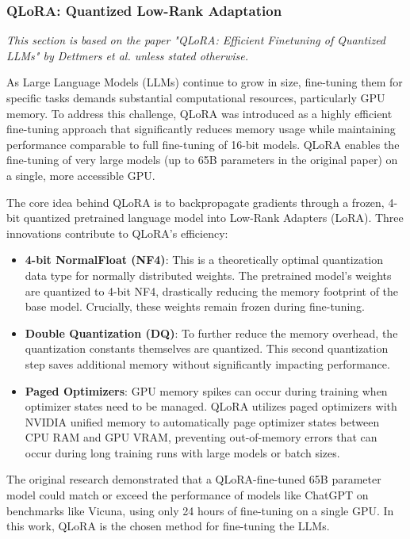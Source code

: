 \subsubsection{QLoRA: Quantized Low-Rank Adaptation}
\textit{This section is based on the paper "QLoRA: Efficient Finetuning of Quantized LLMs" by Dettmers et al. \cite{dettmers2023qlora} unless stated otherwise.}

As Large Language Models (LLMs) continue to grow in size, fine-tuning them for specific tasks demands substantial computational resources, particularly GPU memory. To address this challenge, QLoRA was introduced as a highly efficient fine-tuning approach that significantly reduces memory usage while maintaining performance comparable to full fine-tuning of 16-bit models. 
QLoRA enables the fine-tuning of very large models (up to 65B parameters in the original paper) on a single, more accessible GPU.

The core idea behind QLoRA is to backpropagate gradients through a frozen, 4-bit quantized pretrained language model into Low-Rank Adapters (LoRA). 
Three innovations contribute to QLoRA's efficiency:

\begin{itemize}
    \item \textbf{4-bit NormalFloat (NF4)}: This is a theoretically optimal quantization data type for normally distributed weights. The pretrained model's weights are quantized to 4-bit NF4, drastically reducing the memory footprint of the base model. Crucially, these weights remain frozen during fine-tuning.
    \item \textbf{Double Quantization (DQ)}: To further reduce the memory overhead, the quantization constants themselves are quantized. This second quantization step saves additional memory without significantly impacting performance.
    \item \textbf{Paged Optimizers}: GPU memory spikes can occur during training when optimizer states need to be managed. QLoRA utilizes paged optimizers with NVIDIA unified memory to automatically page optimizer states between CPU RAM and GPU VRAM, preventing out-of-memory errors that can occur during long training runs with large models or batch sizes.
\end{itemize}

The original research demonstrated that a QLoRA-fine-tuned 65B parameter model could match or exceed the performance of models like ChatGPT on benchmarks like Vicuna, using only 24 hours of fine-tuning on a single GPU. 
In this work, QLoRA is the chosen method for fine-tuning the LLMs.
